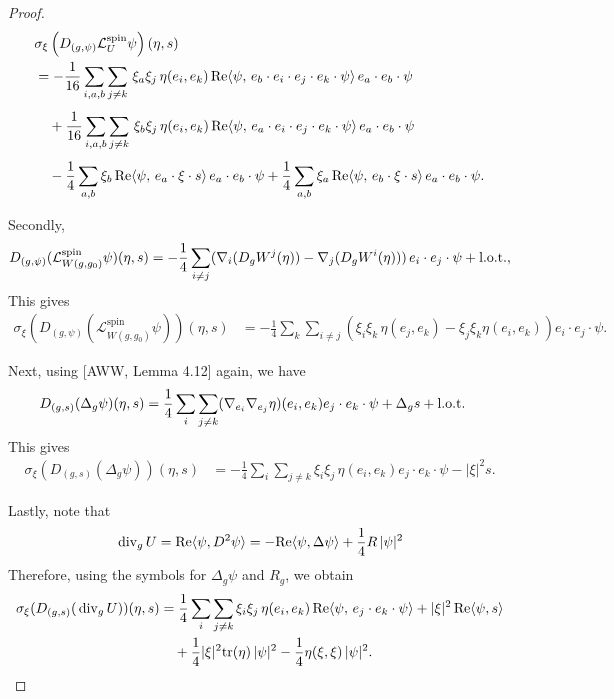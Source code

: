 \documentclass{amsart}
\theoremstyle{definition}
\theoremstyle{remark}
\numberwithin{equation}{section}
\newcommand{\tr}{\textup{tr}}
\newcommand{\lot}{\textup{l.o.t.}}
\renewcommand{\div}{\,\textup{div}}
\begin{document}
\begin{proof}
	\begin{align}
		&\sigma_{\xi}\left(D_{(g,\psi)}\mathcal{L}_{U}^{\text{spin}}\psi\right)(\eta,s)\\
		&= -\frac{1}{16}\sum_{i,a,b}\sum_{j\neq k}\, \xi_a\xi_j\, \eta(e_i, e_k)\, \textup{Re}\langle \psi,\, e_b\cdot e_i\cdot e_j\cdot e_k\cdot\psi\rangle \, e_a\cdot e_b\cdot \psi\\[1ex]
		&\quad  + \frac{1}{16}\sum_{i,a,b}\sum_{j\neq k}\, \xi_b\xi_j\, \eta (e_i, e_k)\, \textup{Re}\langle \psi,\, e_a\cdot e_i\cdot e_j\cdot e_k\cdot\psi\rangle \, e_a\cdot e_b\cdot\psi\\[1ex]
		&\quad -  \frac{1}{4}\sum_{a, b}\xi_b\, \textup{Re}\langle\psi,\, e_a\cdot \xi\cdot s\rangle \, e_a\cdot e_b\cdot \psi +  \frac{1}{4}\sum_{a, b} \xi_a\, \textup{Re}\langle\psi,\, e_b\cdot \xi\cdot s\rangle  \, e_a\cdot e_b\cdot \psi.
	\end{align}


Secondly,
\begin{align*}
	D_{(g,\psi)}(\mathcal{L}_{W(g,g_0)}^{\text{spin}}\psi)(\eta,s) =  -\frac{1}{4}\sum_{i\neq j}(\nabla_i (D_g W^j(\eta)) - \nabla_j (D_g W^i(\eta)))\, e_i\cdot e_j\cdot \psi + \lot,
\end{align*}
This gives
\begin{align*}
	\sigma_{\xi}(D_{(g,\psi)}(\mathcal{L}_{W(g,g_0) }^{\text{spin}}\psi))(\eta,s) &= -\frac{1}{4}\sum_k\sum_{i\neq j}(\xi_i\xi_k\,\eta(e_j, e_k) - \xi_j\xi_k\eta(e_i, e_k))e_i\cdot e_j\cdot \psi.
\end{align*}


Next, using [AWW, Lemma 4.12] again, we have
\begin{align*}
	D_{(g,s)}(\Delta_g\psi)(\eta,s) &= \frac{1}{4}\sum_i\sum_{j\neq k}(\nabla_{e_i}\nabla_{e_j}\eta)(e_i,e_k)e_j\cdot e_k\cdot\psi + \Delta_g s + \lot
\end{align*}
This gives
\begin{align*}
	\sigma_{\xi}(D_{(g,s)}(\Delta_g\psi))(\eta,s) &= -\frac{1}{4}\sum_i\sum_{j\neq k}\xi_i\xi_j\, \eta(e_i,e_k)e_j\cdot e_k\cdot\psi - |\xi|^2 s.
\end{align*}



Lastly, note that 
\begin{align*}
	\div_g\, U = \text{Re}\langle\psi, D^2\psi\rangle= -\text{Re}\langle\psi, \Delta\psi\rangle + \frac{1}{4}R \,|\psi|^2
\end{align*}
Therefore, using the symbols for $\Delta_g\psi$ and $R_g$, we obtain
\begin{align*}
	\sigma_{\xi}(D_{(g,s)}(\div_g\, U))(\eta,s) &=  \frac{1}{4}\sum_i\sum_{j\neq k}\xi_i\xi_j\, \eta(e_i,e_k)\, \text{Re}\langle\psi,\,e_j\cdot e_k\cdot\psi\rangle + |\xi|^2\,\text{Re}\langle\psi, s\rangle\\
	&\quad + \frac{1}{4}|\xi|^2\tr(\eta)\,|\psi|^2 -  \frac{1}{4}\eta(\xi,\xi)\,|\psi|^2.
\end{align*}
\end{proof}
\end{document}
